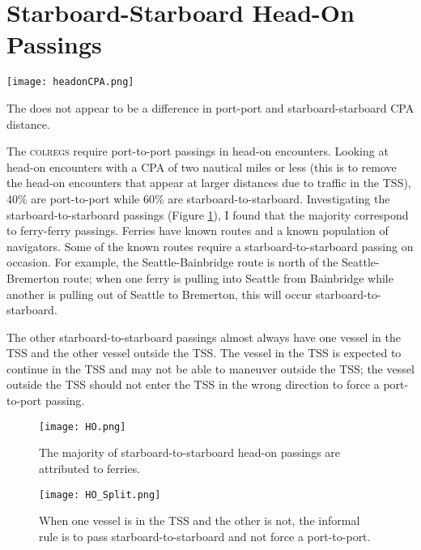 \documentclass[twoside,symmetric,notoc]{tufte-book}
\begin{document}
\section{Starboard-Starboard Head-On Passings}
\begin{marginfigure}
    \texttt{[image: headonCPA.png]}
    \caption{The does not appear to be a difference in port-port and starboard-starboard CPA distance.}
\end{marginfigure}
\par{
The \textsc{colregs} require port-to-port passings in head-on encounters. Looking at head-on encounters with a CPA of two nautical miles or less (this is to remove the head-on encounters that appear at larger distances due to traffic in the TSS), 40\% are port-to-port while 60\% are starboard-to-starboard. Investigating the starboard-to-starboard passings (Figure \ref{fig:head_on_encounters}), I found that the majority correspond to ferry-ferry passings. Ferries have known routes and a known population of navigators. Some of the known routes require a starboard-to-starboard passing on occasion. For example, the Seattle-Bainbridge route is north of the Seattle-Bremerton route; when one ferry is pulling into Seattle from Bainbridge while another is pulling out of Seattle to Bremerton, this will occur starboard-to-starboard. 
}
\par{
The other starboard-to-starboard passings almost always have one vessel in the TSS and the other vessel outside the TSS. The vessel in the TSS is expected to continue in the TSS and may not be able to maneuver outside the TSS; the vessel outside the TSS should not enter the TSS in the wrong direction to force a port-to-port passing.
\begin{figure}
    \centering
    \texttt{[image: HO.png]}
    \caption{The majority of starboard-to-starboard head-on passings are attributed to ferries.}
    \label{fig:head_on_encounters}
\end{figure}
\begin{figure}
    \centering
    \texttt{[image: HO\_Split.png]}
    \caption{When one vessel is in the TSS and the other is not, the informal rule is to pass starboard-to-starboard and not force a port-to-port.}
    \label{fig:my_label}
\end{figure}
}
\newline
\end{document}
